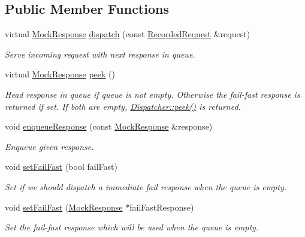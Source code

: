 \subsection*{Public Member Functions}
\begin{DoxyCompactItemize}
\item 
virtual \hyperlink{class_mock_response}{Mock\+Response} \hyperlink{class_queue_dispatcher_ae5fe9ec67b24b75ece3f28d908e2764e}{dispatch} (const \hyperlink{class_recorded_request}{Recorded\+Request} \&request)
\begin{DoxyCompactList}\small\item\em Serve incoming request with next response in queue. \end{DoxyCompactList}\item 
virtual \hyperlink{class_mock_response}{Mock\+Response} \hyperlink{class_queue_dispatcher_acea23f016b5fd62ec7cc94ee1db1816e}{peek} ()
\begin{DoxyCompactList}\small\item\em Head response in queue if queue is not empty. Otherwise the fail-\/fast response is returned if set. If both are empty, \hyperlink{class_dispatcher_af4768d8abe65389a5cdbb48499c32a0f}{Dispatcher\+::peek()} is returned. \end{DoxyCompactList}\item 
void \hyperlink{class_queue_dispatcher_a5ce0e46fe53d760fe98da7ec010dc0ef}{enqueue\+Response} (const \hyperlink{class_mock_response}{Mock\+Response} \&response)
\begin{DoxyCompactList}\small\item\em Enqueue given response. \end{DoxyCompactList}\item 
void \hyperlink{class_queue_dispatcher_a2f09193b180fb46fe7b0822022b52222}{set\+Fail\+Fast} (bool fail\+Fast)
\begin{DoxyCompactList}\small\item\em Set if we should dispatch a immediate fail response when the queue is empty. \end{DoxyCompactList}\item 
void \hyperlink{class_queue_dispatcher_ab7a07e38d21032f2657896c647cb6f2f}{set\+Fail\+Fast} (\hyperlink{class_mock_response}{Mock\+Response} $\ast$fail\+Fast\+Response)
\begin{DoxyCompactList}\small\item\em Set the fail-\/fast response which will be used when the queue is empty. \end{DoxyCompactList}\end{DoxyCompactItemize}
